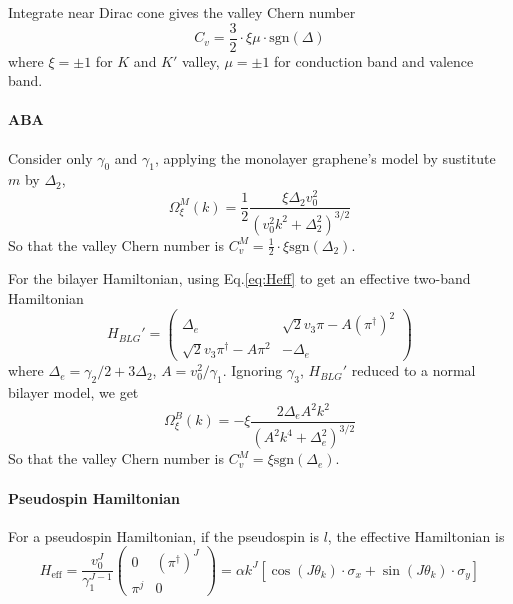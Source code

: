 \documentclass[12pt,a4paper]{article}
\begin{document}
    Integrate near Dirac cone gives the valley Chern number
    \begin{equation}
    \label{eq:Cv_ABC}
        C_v = \frac{3}{2} \cdot \xi\mu \cdot \mathrm{sgn}(\Delta)
    \end{equation}
    where $\xi=\pm1$ for $K$ and $K'$ valley, $\mu=\pm1$ for conduction band and valence band.


\paragraph{ABA}

    Consider only $\gamma_0$ and $\gamma_1$, applying the monolayer graphene's model by sustitute $m$ by $\Delta_2$,
    \begin{equation}
    \label{eq:Omega_ABA_M}
        \Omega_{\xi}^M(k) = \frac{1}{2} \frac{\xi \Delta_2 v_0^2}{\left(v_0^2 k^2 + \Delta_2^2\right)^{3/2}}
    \end{equation}
    So that the valley Chern number is $C_v^M = \frac{1}{2} \cdot \xi\mathrm{sgn}(\Delta_2)$.

    For the bilayer Hamiltonian, using Eq.\eqref{eq:Heff} to get an effective two-band Hamiltonian
    \[
        H_{BLG}' = \begin{pmatrix}
            \Delta_{e}    & \sqrt{2}v_3\pi - A \left(\pi^\dagger\right)^2 \\
            \sqrt{2}v_3\pi^\dagger - A \pi^2 & -\Delta_{e}
        \end{pmatrix}
    \]
    where $\Delta_{e} = \gamma_2/2 + 3\Delta_2$, $A = v_0^2/\gamma_1$. Ignoring $\gamma_3$, $H_{BLG}'$ reduced to a normal bilayer model, we get
    \begin{equation}
    \label{eq:Omega_ABA_B}
        \Omega_{\xi}^B(k) = -\xi \frac{2 \Delta_{e} A^2 k^2}{\left(A^2 k^4 + \Delta_{e}^2\right)^{3/2}}
    \end{equation}
    So that the valley Chern number is $C_v^M = \xi\mathrm{sgn}(\Delta_e)$.

\paragraph{Pseudospin Hamiltonian}

    For a pseudospin Hamiltonian, if the pseudospin is $l$, the effective Hamiltonian is
    \begin{equation}
    \label{eq:}
        H_{\mathrm{eff}} = \frac{v_0^J}{\gamma_1^{J-1}} \begin{pmatrix}
            0 & \left(\pi^\dagger\right)^J \\
            \pi^j & 0
        \end{pmatrix}
        = \alpha k^J \left[\cos(J\theta_k) \cdot \sigma_x + \sin(J\theta_k) \cdot \sigma_y\right]
    \end{equation}
\end{document}
